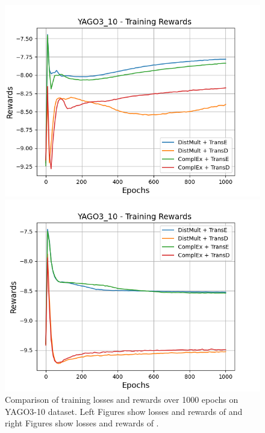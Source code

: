\begin{figure}[H]
\begin{minipage}{.45\textwidth}
      \includegraphics[width=0.9\linewidth]{figures/results/gan_train/not_pretrained/random/yago3_10/1k_epochs/random_yago3_10_rew.png}
    \end{minipage}%
    \begin{minipage}{.45\textwidth}
      \centering
      \includegraphics[width=0.9\linewidth]{figures/results/gan_train/not_pretrained/uncertainty/max_distribution/entropy/yago3_10/1k_epochs/uncertainty_yago3_10_rew.png}
    \end{minipage}%
    \caption{Comparison of training losses and rewards over 1000 epochs on \textsc{YAGO3-10}  dataset.
    Left Figures show losses and rewards of \origsampling and right Figures show losses and rewards of \ussoftmax.}
    \label{fig:advtrain_yago3_10_losses_rewards}
\end{figure}